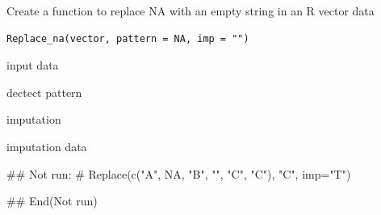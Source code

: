 \documentclass[a4paper]{book}
\begin{document}
%
\begin{Description}
Create a function to replace NA with an empty string in an R vector data
\end{Description}
%
\begin{Usage}
\begin{verbatim}
Replace_na(vector, pattern = NA, imp = "")
\end{verbatim}
\end{Usage}
%
\begin{Arguments}
\begin{ldescription}
\item[\code{vector}] input data

\item[\code{pattern}] dectect pattern

\item[\code{imp}] imputation
\end{ldescription}
\end{Arguments}
%
\begin{Value}
imputation data
\end{Value}
%
\begin{Examples}
\begin{ExampleCode}

\#\# Not run: 
# Replace(c("A", NA, "B", "", "C", "C"), "C", imp="T")

## End(Not run)

\end{ExampleCode}
\end{Examples}
\end{document}
